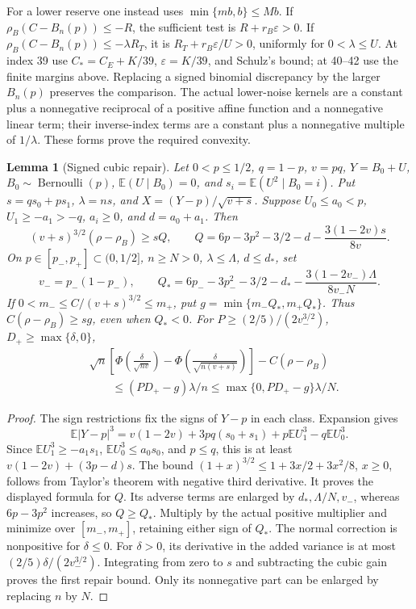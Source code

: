 \documentclass[11pt,a4paper]{article}
\numberwithin{equation}{section}
\newtheorem{lemma}[theorem]{Lemma}
\theoremstyle{definition}
\theoremstyle{remark}
\newcommand{\E}{\mathbb E}
\begin{document}
For a lower reserve one instead uses \(\min\{mb,b\}\le Mb\).
If \(\rho_B(C-B_n(p))\le-R\), the sufficient test is
\(R+r_B\varepsilon>0\). If
\(\rho_B(C-B_n(p))\le-\lambda R_T\), it is
\(R_T+r_B\varepsilon/U>0\), uniformly for \(0<\lambda\le U\).
At index 39 use \(C_*=C_E+K/39\), \(\varepsilon=K/39\),
and Schulz's bound; at 40--42 use the finite margins above.
Replacing a signed binomial discrepancy by the larger \(B_n(p)\)
preserves the comparison.
The actual lower-noise kernels are a constant plus a nonnegative
reciprocal of a positive affine function and a nonnegative linear
term; their inverse-index terms are a constant plus a nonnegative
multiple of \(1/\lambda\). These forms prove the required convexity.

\begin{lemma}[Signed cubic repair]\label{cut31:signed-cubic-repair}
Let \(0<p\le1/2\), \(q=1-p\), \(v=pq\), \(Y=B_0+U\),
\(B_0\sim\operatorname{Bernoulli}(p)\),
\(\E(U\mid B_0)=0\), and \(s_i=\E(U^2\mid B_0=i)\).
Put \(s=qs_0+ps_1\), \(\lambda=ns\), and
\(X=(Y-p)/\sqrt{v+s}\). Suppose
\(U_0\le a_0<p\), \(U_1\ge-a_1>-q\), \(a_i\ge0\),
and \(d=a_0+a_1\). Then
\[
 (v+s)^{3/2}(\rho-\rho_B)\ge sQ,\qquad
 Q=6p-3p^2-3/2-d-\frac{3(1-2v)s}{8v}.
\]
On \(p\in[p_-,p_+]\subset(0,1/2]\), \(n\ge N>0\),
\(\lambda\le\Lambda\), \(d\le d_*\), set
\[
 v_-=p_-(1-p_-),\qquad
 Q_*=6p_--3p_-^2-3/2-d_*
       -\frac{3(1-2v_-)\Lambda}{8v_-N}.
\]
If \(0<m_-\le C/(v+s)^{3/2}\le m_+\), put
\(g=\min\{m_-Q_*,m_+Q_*\}\). Thus
\(C(\rho-\rho_B)\ge sg\), even when \(Q_*<0\).
For \(P\ge(2/5)/(2v_-^{3/2})\),
\(D_+\ge\max\{\delta,0\}\),
\begin{align*}
 &\sqrt n\left[\Phi\left(\frac\delta{\sqrt{nv}}\right)
 -\Phi\left(\frac\delta{\sqrt{n(v+s)}}\right)\right]
 -C(\rho-\rho_B)\\
 &\qquad\le(PD_+-g)\lambda/n
 \le\max\{0,PD_+-g\}\lambda/N.
\end{align*}
\end{lemma}
\begin{proof}
The sign restrictions fix the signs of \(Y-p\) in each class.
Expansion gives
\[
 \E|Y-p|^3=v(1-2v)+3pq(s_0+s_1)
                    +p\E U_1^3-q\E U_0^3.
\]
Since \(\E U_1^3\ge-a_1s_1\),
\(\E U_0^3\le a_0s_0\), and \(p\le q\), this is at least
\(v(1-2v)+(3p-d)s\).
The bound \((1+x)^{3/2}\le1+3x/2+3x^2/8\), \(x\ge0\),
follows from Taylor's theorem with negative third derivative.
It proves the displayed formula for \(Q\).
Its adverse terms are enlarged by \(d_*,\Lambda/N,v_-\),
whereas \(6p-3p^2\) increases, so \(Q\ge Q_*\).
Multiply by the actual positive multiplier and minimize over
\([m_-,m_+]\), retaining either sign of \(Q_*\).
The normal correction is nonpositive for \(\delta\le0\).
For \(\delta>0\), its derivative in the added variance is at most
\((2/5)\delta/(2v_-^{3/2})\). Integrating from zero to \(s\)
and subtracting the cubic gain proves the first repair bound.
Only its nonnegative part can be enlarged by replacing \(n\) by \(N\).
\end{proof}
\end{document}
